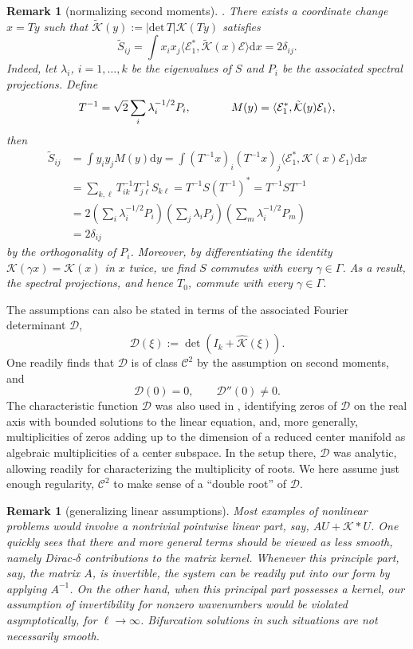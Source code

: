 \documentclass[10pt]{article}
\newtheorem{Remark}[Lemma]{Remark}
\newcommand{\rmd}{\mathrm{d}}
\newcommand{\K}{\mathcal{K}}
\begin{document}
\begin{Remark}[normalizing second moments]\label{r:rs}. There exists a coordinate change $x=T y$ such that $\tilde{\K}(y):=|\mathrm{det}\,T|\K(T y)$ satisfies
\[
\tilde{S}_{ij}=\int x_ix_j\langle \mathcal{E}_1^*,\tilde{\K}(x) \mathcal{E}\rangle\rmd x=2\delta_{ij}.
\]
Indeed, let $\lambda_i$, $i=1,\ldots,k$ be the eigenvalues of $S$ and $P_i$ be the associated spectral projections. Define
\[
T^{-1} = \sqrt{2}\sum_{i} \lambda_i^{-1/2} P_i, \hspace{0.5in} M(y) = \langle \mathcal{E}_1^*, \tilde{\K}(y)\mathcal{E}_1 \rangle ,
\]
then
\begin{align*}
\tilde{S}_{ij} &= \int y_iy_j M(y) \rmd y = \int (T^{-1}x)_i(T^{-1}x)_j\langle \mathcal{E}_1^*,\K(x)\mathcal{E}_1 \rangle \rmd x \\
&= \sum_{k,\ell} T^{-1}_{ik}T^{-1}_{j\ell} S_{k\ell}= T^{-1} S(T^{-1})^* = T^{-1}ST^{-1}\\
& =2 \left(\sum_{i} \lambda_i^{-1/2} P_i \right)\left(\sum_{j} \lambda_i P_j \right)\left(\sum_{m} \lambda_i^{-1/2} P_m \right)\\
&=2\delta_{ij}
\end{align*}
by the orthogonality of $P_i$.  Moreover, by differentiating the identity $\K(\gamma x) = \K(x)$ in $x$ twice, we find $S$ commutes with every $\gamma \in \Gamma$. As a result, the spectral projections, and hence $T_0$, commute with every $\gamma \in \Gamma$.
\end{Remark}

The assumptions can also be stated in terms of the associated Fourier determinant $\mathcal{D}$,
\[
\mathcal{D}(\xi):=\det(I_k+\widehat{\K}(\xi)).
\]
One readily finds that $\mathcal{D}$ is of class $\mathscr{C}^2$ by the assumption on second moments, and 
\[
\mathcal{D}(0)=0,\qquad  \mathcal{D}''(0)\neq 0.
\]
The characteristic function $\mathcal{D}$ was also used in \cite{FScmfd}, identifying zeros of $\mathcal{D}$ on the real axis with bounded solutions to the linear equation, and, more generally, multiplicities of zeros adding up to the dimension of a reduced center manifold as algebraic multiplicities of a center subspace. In the setup there, $\mathcal{D}$ was analytic, allowing readily for characterizing the multiplicity of roots. We here assume just enough regularity, $\mathscr{C}^2$ to make sense of a ``double root'' of $\mathcal{D}$.

\begin{Remark}[generalizing linear assumptions]\label{r:gl}
Most examples of nonlinear problems would involve a nontrivial pointwise linear part, say, $AU+\K*U$. One quickly sees that there and more general terms should be viewed as less smooth, namely Dirac-$\delta$ contributions to the matrix kernel. Whenever this principle part, say, the matrix $A$, is invertible, the system can be readily put into our form by applying $A^{-1}$. On the other hand, when this principal part possesses a kernel, our assumption of invertibility for nonzero wavenumbers would be violated asymptotically, for $\ell\to\infty$. Bifurcation solutions in such situations are not necessarily smooth. 
\end{Remark}
\end{document}
